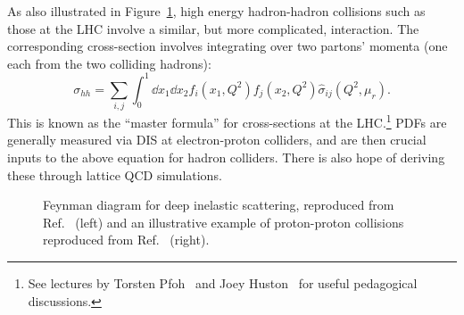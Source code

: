 As also illustrated in Figure~\ref{fig:01_sm_qcd_dis}, high energy hadron-hadron collisions such as those at the LHC involve a similar, but more complicated, interaction.
The corresponding cross-section involves integrating over two partons' momenta (one each from the two colliding hadrons):
\begin{equation}
	\label{eq:01_sm_qcd_sigma_pp}
	\sigma_{hh} = \sum_{i, j} \int_0^1 \dd x_1 \dd x_2 f_i(x_1, Q^2) f_j(x_2, Q^2) \hat\sigma_{ij}(Q^2, \mu_r).
\end{equation}
This is known as the ``master formula'' for cross-sections at the LHC.\footnote{See lectures by Torsten Pfoh~\cite{Pfoh:2012Lectures} and Joey Huston~\cite{Huston:2018Lectures} for useful pedagogical discussions.}
PDFs are generally measured via DIS at electron-proton colliders, and are then crucial inputs to the above equation for hadron colliders.
There is also hope of deriving these through lattice QCD simulations.

\begin{figure}
	\centering
	\hspace{1cm}
	\caption{Feynman diagram for deep inelastic scattering, reproduced from Ref.~\cite{enwiki:1240848406} (left) and an illustrative example of proton-proton collisions reproduced from Ref.~\cite{ATLAS:2024protoncollisions} (right).}
	\label{fig:01_sm_qcd_dis}
\end{figure}

